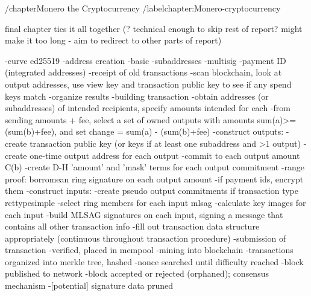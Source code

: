 /chapter{Monero the Cryptocurrency}
/label{chapter:Monero-cryptocurrency}

final chapter ties it all together (? technical enough to skip rest of report? might make it too long - aim to redirect to other parts of report)

-curve ed25519
-address creation
    -basic
    -subaddresses
    -multisig
    -payment ID (integrated addresses)
-receipt of old transactions
    -scan blockchain, look at output addresses, use view key and transaction public key to see if any spend keys match
    -organize results
-building transaction
    -obtain addresses (or subaddresses) of intended recipients, specify amounts intended for each
    -from sending amounts + fee, select a set of owned outputs with amounts sum(a)>=(sum(b)+fee), and set change = sum(a) - (sum(b)+fee)
    -construct outputs:
        -create transaction public key (or keys if at least one subaddress and >1 output)
        -create one-time output address for each output
        -commit to each output amount C(b)
        -create D-H 'amount' and 'mask' terms for each output commitment
        -range proof: borromean ring signature on each output amount
        -if payment ids, encrypt them
    -construct inputs:
        -create pseudo output commitments if transaction type rcttypesimple
        -select ring members for each input mlsag
        -calculate key images for each input
        -build MLSAG signatures on each input, signing a message that contains all other transaction info
    -fill out transaction data structure appropriately (continuous throughout transaction procedure)
-submission of transaction
    -verified, placed in mempool
-mining into blockchain
    -transactions organized into merkle tree, hashed
    -nonce searched until difficulty reached
    -block published to network
    -block accepted or rejected (orphaned); consensus mechanism
    -[potential] signature data pruned

